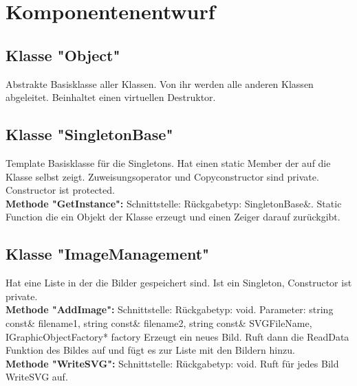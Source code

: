\documentclass[12pt,a4paper]{article}
\begin{document}
\newpage
\section {Komponentenentwurf}
\subsection {Klasse "Object"}
Abstrakte Basisklasse aller Klassen. Von ihr werden alle anderen Klassen abgeleitet. Beinhaltet einen virtuellen Destruktor.


\subsection {Klasse "SingletonBase"}
Template Basisklasse für die Singletons. Hat einen static Member der auf die Klasse selbst zeigt. Zuweisungsoperator und Copyconstructor sind private. Constructor ist protected.
\\

\textbf {Methode "GetInstance": } 
\newline
Schnittstelle: 
Rückgabetyp: SingletonBase\&.
\newline
Static Function die ein Objekt der Klasse erzeugt und einen Zeiger darauf zurückgibt.
\\

\subsection {Klasse "ImageManagement"}
Hat eine Liste in der die Bilder gespeichert sind. Ist ein Singleton, Constructor ist private.
\\

\textbf {Methode "AddImage": } 
\newline
Schnittstelle: 
Rückgabetyp: void.
\newline
Parameter: string const\& filename1, string const\& filename2, string const\& SVGFileName, IGraphicObjectFactory* factory
\newline
Erzeugt ein neues Bild. Ruft dann die ReadData Funktion des Bildes auf und fügt es zur Liste mit den Bildern hinzu.
\\

\textbf {Methode "WriteSVG": } 
\newline
Schnittstelle:
\newline
Rückgabetyp: void.
\newline
Ruft für jedes Bild WriteSVG auf.
\\
\end{document}
